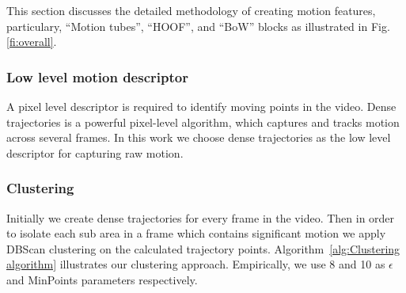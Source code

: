 This section discusses the detailed methodology of creating motion features, particulary, ``Motion tubes'', ``HOOF'', and ``BoW'' blocks as illustrated in Fig. \ref{fi:overall}. 

\subsubsection{Low level motion descriptor}
A pixel level descriptor is required to identify moving points in the video. Dense trajectories \cite{wang2011action} is a powerful
pixel-level algorithm, which captures and tracks motion across several frames. In this work
we choose dense trajectories as the low level descriptor for capturing raw motion.

\subsubsection{Clustering}

Initially we create dense trajectories for every frame in the video.
Then in order to isolate each sub area in a frame which contains significant motion we apply DBScan clustering on the calculated trajectory points.
Algorithm~\ref{alg:Clustering algorithm}  illustrates our clustering approach. Empirically, we use 8 and 10 as $\epsilon$ and MinPoints parameters respectively.




